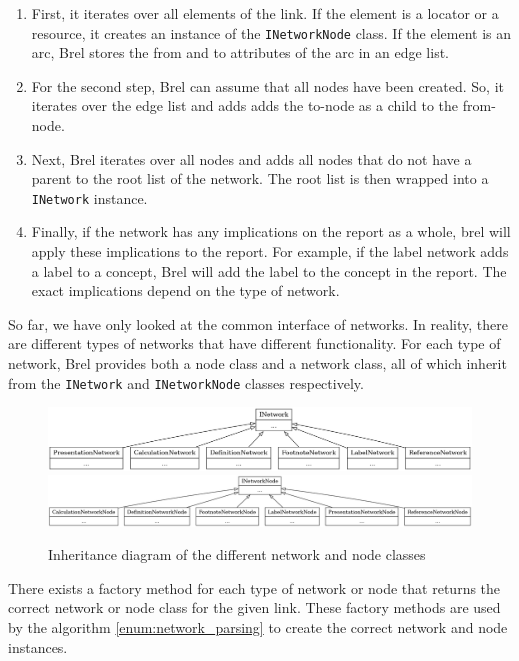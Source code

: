\begin{enumerate}\label{enum:network_parsing}
    \item First, it iterates over all elements of the link. 
    If the element is a locator or a resource, it creates an instance of the \texttt{INetworkNode} class.
    If the element is an arc, Brel stores the from and to attributes of the arc in an edge list.
    \item For the second step, Brel can assume that all nodes have been created.
    So, it iterates over the edge list and adds adds the to-node as a child to the from-node.
    \item Next, Brel iterates over all nodes and adds all nodes that do not have a parent to the root list of the network.
    The root list is then wrapped into a \texttt{INetwork} instance.
    \item Finally, if the network has any implications on the report as a whole, brel will apply these implications to the report.
    For example, if the label network adds a label to a concept, Brel will add the label to the concept in the report.
    The exact implications depend on the type of network.
\end{enumerate}

So far, we have only looked at the common interface of networks.
In reality, there are different types of networks that have different functionality.
For each type of network, Brel provides both a node class and a network class, all of which inherit from the \texttt{INetwork} and \texttt{INetworkNode} classes respectively.

\begin{figure}[H]
    \caption{Inheritance diagram of the different network and node classes}
    \label{fig:network_inheritance_diagram}
    \includegraphics[width=\textwidth]{images/network_types.png}
    \includegraphics[width=\textwidth]{images/network_node_types.png}
\end{figure}

There exists a factory method for each type of network or node that returns the correct network or node class for the given link.
These factory methods are used by the algorithm \ref{enum:network_parsing} to create the correct network and node instances.

